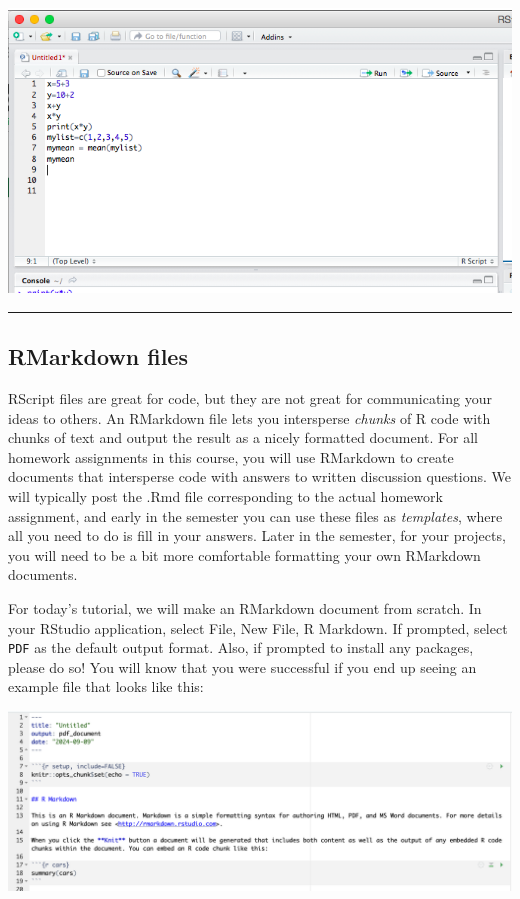 \documentclass[
]{article}
\begin{document}
\includegraphics[width=7.29167in,height=\textheight,keepaspectratio]{more/RScriptpractice.png}

\begin{center}\rule{0.5\linewidth}{0.5pt}\end{center}

\subsection{RMarkdown files}\label{rmarkdown-files}

RScript files are great for code, but they are not great for
communicating your ideas to others. An RMarkdown file lets you
intersperse \emph{chunks} of R code with chunks of text and output the
result as a nicely formatted document. For all homework assignments in
this course, you will use RMarkdown to create documents that intersperse
code with answers to written discussion questions. We will typically
post the .Rmd file corresponding to the actual homework assignment, and
early in the semester you can use these files as \emph{templates}, where
all you need to do is fill in your answers. Later in the semester, for
your projects, you will need to be a bit more comfortable formatting
your own RMarkdown documents.

For today's tutorial, we will make an RMarkdown document from scratch.
In your RStudio application, select File, New File, R Markdown. If
prompted, select \texttt{PDF} as the default output format. Also, if
prompted to install any packages, please do so! You will know that you
were successful if you end up seeing an example file that looks like
this:

\includegraphics[width=9.375in,height=\textheight,keepaspectratio]{RMarkdown.png}
\end{document}

